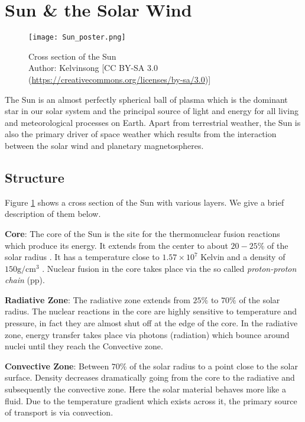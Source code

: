 \section{Sun \& the Solar Wind}\label{sec:solar}

\begin{figure}
    \noindent\centering\texttt{[image: Sun\_poster.png]}
    \caption{\small{Cross section of the Sun \\ 
    Author: Kelvinsong [CC BY-SA 3.0 (\url{https://creativecommons.org/licenses/by-sa/3.0})]}}
    \label{fig:SunLayers}
\end{figure}

The Sun is an almost perfectly spherical ball of plasma which is the dominant star in our solar system and 
the principal source of light and energy for all living and meteorological processes on Earth. Apart from 
terrestrial weather, the Sun is also the primary driver of space weather which results from the interaction 
between the solar wind and planetary magnetospheres.

\subsection{Structure}

Figure \ref{fig:SunLayers} shows a cross section of the Sun with various layers. We give a brief description 
of them below.

\textbf{Core}: The core of the Sun is the site for the thermonuclear fusion reactions which produce its energy. 
It extends from the center to about $20-25\%$ of the solar radius \citep{SolarAct}. It has a temperature close to 
$1.57 \times 10^7$ Kelvin and a density of $150 \text{g}/\text{cm}^3$ \citep{SolarCore}. Nuclear fusion in the core 
takes place via the so called \emph{proton-proton chain} (pp).

\textbf{Radiative Zone}: The radiative zone extends from $25\%$ to $70\%$ of the solar radius. The nuclear reactions 
in the core are highly sensitive to temperature and pressure, in fact they are almost shut off at the edge of the core. 
In the radiative zone, energy transfer takes place via photons (radiation) which bounce around nuclei until 
they reach the Convective zone.

\textbf{Convective Zone}: Between $70\%$ of the solar radius to a point close to the solar surface. Density decreases 
dramatically going from the core to the radiative and subsequently the convective zone. Here the solar material behaves more 
like a fluid. Due to the temperature gradient which exists across it, the primary source of transport is 
via convection.

